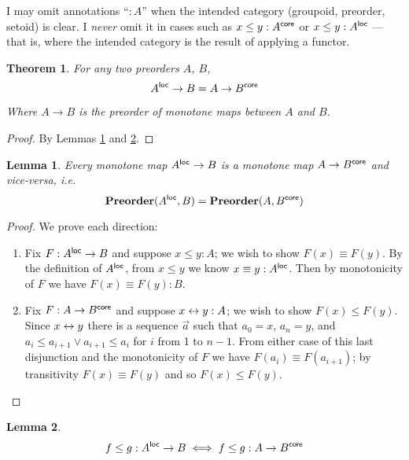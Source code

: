 \documentclass{article}
\newtheorem{theorem}{Theorem}
\newtheorem{lemma}{Lemma}
\newcommand{\mb}[1]{\ensuremath{\mathbf{#1}}}
\begin{document}
I may omit annotations ``$: A$'' when the intended category (groupoid, preorder,
setoid) is clear. I \emph{never} omit it in cases such as $x \le y : A^{\mathsf{core}}$ or
$x \le y : A^{\mathsf{loc}}$ --- that is, where the intended category is the result of
applying a functor.

\begin{theorem}\label{thm:loccore} For any two preorders $A$, $B$,
  \begin{equation}
    A^{\mathsf{loc}} \to B = A \to B^{\mathsf{core}}
  \end{equation}

  Where $A \to B$ is the preorder of monotone maps between $A$ and $B$.
\end{theorem}

\begin{proof} By Lemmas \ref{lem:loccore-1} and \ref{lem:loccore-2}.
\end{proof}

\begin{lemma}\label{lem:loccore-1}
  Every monotone map $A^{\mathsf{loc}} \to B$ is a monotone map $A \to B^{\mathsf{core}}$ and
  vice-versa, i.e.
  \[ \mb{Preorder}(A^\loc, B) = \mb{Preorder}(A, B^\core) \]
\end{lemma}

\begin{proof} We prove each direction:
  \begin{enumerate}
  \item Fix $F : A^{\mathsf{loc}} \to B$ and suppose $x \le y : A$; we wish to show $F(x)
    \equiv F(y)$. By the definition of $A^{\mathsf{loc}}$, from $x \le y$ we know $x
    \equiv y : A^{\mathsf{loc}}$. Then by monotonicity of $F$ we have $F(x) \equiv F(y) :
    B$.

  \item Fix $F : A \to B^{\mathsf{core}}$ and suppose $x \leftrightarrow y : A$; we wish to show
    $F(x) \le F(y)$. Since $x \leftrightarrow y$ there is a sequence $\vec{a}$ such that
    $a_0 = x$, $a_n = y$, and $a_i \le a_{i+1} \vee a_{i+1} \le a_i$ for $i$
    from 1 to $n-1$. From either case of this last disjunction and the
    monotonicity of $F$ we have $F(a_i) \equiv F(a_{i+1})$; by transitivity
    $F(x) \equiv F(y)$ and so $F(x) \le F(y)$.
  \end{enumerate}
\end{proof}

\begin{lemma}\label{lem:loccore-2}
  \[f \le g : A^{\mathsf{loc}} \to B \iff f \le g : A \to B^{\mathsf{core}} \]
\end{lemma}
\end{document}
